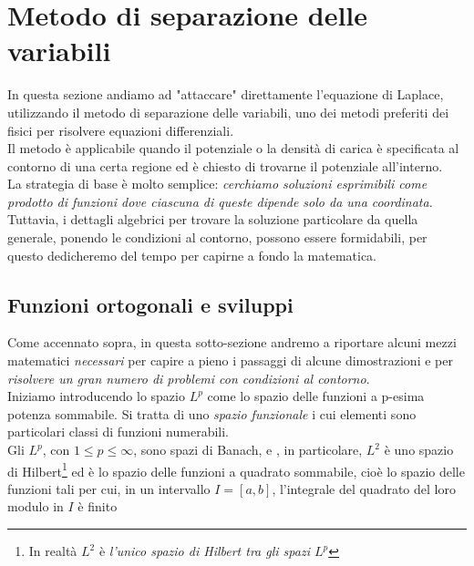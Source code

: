 \section{Metodo di separazione delle variabili}

In questa sezione andiamo ad "attaccare" direttamente l'equazione di Laplace, utilizzando il metodo di separazione delle variabili, uno dei metodi preferiti dei fisici per risolvere equazioni differenziali. \\

Il metodo è applicabile quando il potenziale o la densità di carica è specificata al contorno di una certa regione ed è chiesto di trovarne il potenziale all'interno.\\

La strategia di base è molto semplice: \emph{cerchiamo soluzioni esprimibili come prodotto di funzioni dove ciascuna di queste dipende solo da una coordinata}.\\

Tuttavia, i dettagli algebrici per trovare la soluzione particolare da quella generale, ponendo le condizioni al contorno, possono essere formidabili, per questo dedicheremo del tempo per capirne a fondo la matematica.

\subsection{Funzioni ortogonali e sviluppi}

Come accennato sopra, in questa sotto-sezione andremo a riportare alcuni mezzi matematici \emph{necessari} per capire a pieno i passaggi di alcune dimostrazioni e per \emph{risolvere un gran numero di problemi con condizioni al contorno}. \\

Iniziamo introducendo lo spazio $L^p$  come lo spazio delle funzioni a p-esima potenza sommabile. Si tratta di uno \emph{spazio funzionale} i cui elementi sono particolari classi di funzioni numerabili. \\ 

Gli $L^p$, con $1 \leq p \leq \infty$, sono spazi di Banach, e , in particolare, $L^2$ è uno spazio  di Hilbert\footnote{In realtà $L^2$ è \emph{l'unico spazio di Hilbert tra gli spazi $L^p$ }} ed è lo spazio delle funzioni a quadrato sommabile, cioè lo spazio delle funzioni tali per cui, in un intervallo $I = [a,b]$,  l'integrale del quadrato del loro modulo in $I$ è finito

